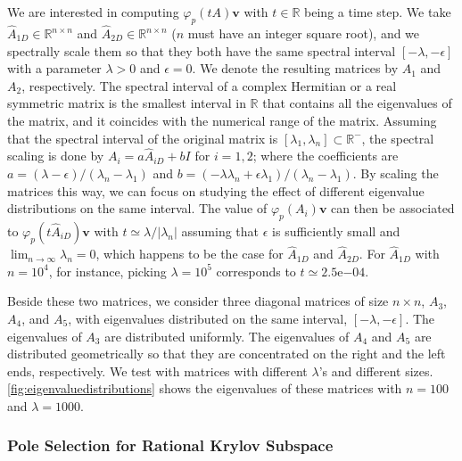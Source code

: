 We are interested in computing $\varphi_p(tA) \mathbf{v}$ with $t \in \mathbb{R}$ being a time step.
We take $\hat{A}_{1D} \in \mathbb{R}^{n \times n}$ and $\hat{A}_{2D} \in \mathbb{R}^{n \times n}$
($n$ must have an integer square root), and we spectrally scale them so that they both have the
same spectral interval $[-\lambda, -\epsilon]$ with a parameter $\lambda > 0$ and $\epsilon = 0$.
We denote the resulting matrices by $A_1$ and $A_2$, respectively.
The spectral interval of a complex Hermitian or a real symmetric matrix is the smallest
interval in $\mathbb{R}$ that contains all the eigenvalues of the matrix, and it coincides
with the numerical range of the matrix.
Assuming that the spectral interval of the original matrix is $[\lambda_1, \lambda_n] \subset \mathbb{R^{-}}$,
the spectral scaling is done by $A_i = a \hat{A}_{iD} + b I$ for $i = 1, 2$; where the coefficients
are $a = (\lambda - \epsilon) / (\lambda_n - \lambda_1)$ and
$b = (- \lambda \lambda_n + \epsilon \lambda_1) / (\lambda_n - \lambda_1)$.
By scaling the matrices this way, we can focus on studying the effect of different eigenvalue
distributions on the same interval. The value of $\varphi_p(A_i) \mathbf{v}$ can then be
associated to $\varphi_p(t\hat{A}_{iD}) \mathbf{v}$ with $t \simeq \lambda / |\lambda_n|$ assuming that $\epsilon$
is sufficiently small and $\lim_{n \to \infty}\lambda_n = 0$,
which happens to be the case for $\hat{A}_{1D}$ and $\hat{A}_{2D}$. For $\hat{A}_{1D}$ with
$n = 10^4$, for instance, picking $\lambda = 10^5$ corresponds to $t \simeq 2.5\mathrm{e}{-04}$.


Beside these two matrices, we consider three diagonal matrices of size
$n \times n$, $A_3$, $A_4$, and $A_5$, with eigenvalues distributed on the same
interval, $[-\lambda, -\epsilon]$. The eigenvalues of $A_3$ are distributed
uniformly. The eigenvalues of $A_4$ and $A_5$ are distributed geometrically so that
they are concentrated on the right and the left ends, respectively. We test with
matrices with different $\lambda$'s and different sizes.
\autoref{fig:eigenvaluedistributions} shows the eigenvalues of these matrices with
$n=100$ and $\lambda = 1000$.

\subsubsection*{Pole Selection for Rational Krylov Subspace}

